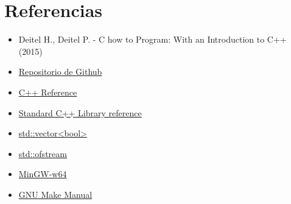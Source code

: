 \documentclass[12pt]{article}
\begin{document}
\pagebreak
\section{Referencias}

\begin{itemize}
    \item Deitel H., Deitel P. - C how to Program: With an Introduction to C++
        (2015)
    \item
        \href{https://github.com/mjkloeckner/CB100}{Repositorio de Github}
    \item
        \href{https://en.cppreference.com/w/}{C++ Reference}
    \item
        \href{https://cplusplus.com/reference/}{Standard C++ Library reference}
    \item
        \href{https://en.cppreference.com/w/cpp/container/vector_bool}{
            std::vector\textless bool\textgreater}
    \item
        \href{https://cplusplus.com/reference/fstream/ofstream/}{std::ofstream}
    \item
        \href{https://www.mingw-w64.org/}{MinGW-w64}
    \item
        \href{https://www.gnu.org/software/make/manual/html_node/index.html}{GNU
        Make Manual}
\end{itemize}
\end{document}
